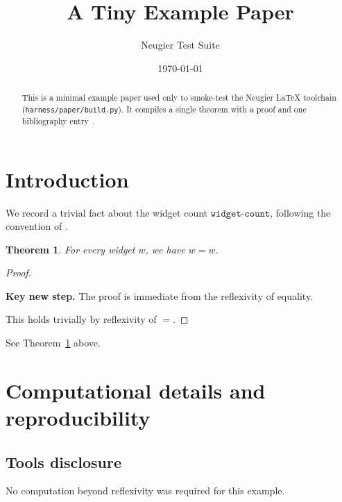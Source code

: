 \documentclass[11pt]{amsart}
\title{A Tiny Example Paper}
\author{Neugier Test Suite}
\date{\today}
\theoremstyle{plain}
\newtheorem{theorem}{Theorem}[section]
\theoremstyle{definition}
\theoremstyle{remark}
\newcommand{\claim}[1]{}
\newcommand{\keystep}[1]{\par\noindent\colorbox{yellow!20}{\parbox{\dimexpr\linewidth-2\fboxsep}{\textbf{Key new step.} #1}}\par}
\newcommand{\numref}[1]{\texttt{#1}}
\begin{document}
\begin{abstract}
This is a minimal example paper used only to smoke-test the Neugier
LaTeX toolchain (\texttt{harness/paper/build.py}). It compiles a single
theorem with a proof and one bibliography entry~\cite{example2024}.
\end{abstract}

\maketitle

\section{Introduction}

We record a trivial fact about the widget count $\numref{widget-count}$,
following the convention of \cite{example2024}.

\begin{theorem}\claim{T-EXAMPLE}\label{thm:main}
For every widget $w$, we have $w = w$.
\end{theorem}

\begin{proof}
\keystep{The proof is immediate from the reflexivity of equality.}
This holds trivially by reflexivity of $=$.
\end{proof}

See Theorem~\ref{thm:main} above.

\section{Computational details and reproducibility}

\subsection{Tools disclosure}
No computation beyond reflexivity was required for this example.



\end{document}
